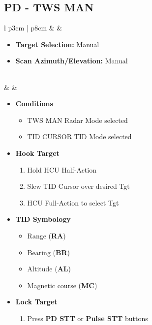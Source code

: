 \documentclass[10pt,usenames,dvipsnames,twoside]{report}
\begin{document}
	\subsection{PD - TWS MAN}
	\thumbnar
	\begin{center}
		\begin{longtable}{l p{3cm} | p{8cm}}
			\toprule
			\textbullet &  &
			\begin{minipage}[t]{\linewidth}
				\vspace{-7pt}
				\begin{itemize}
					\item \textbf{Target Selection:} Manual
					\item \textbf{Scan Azimuth/Elevation:} Manual
				\end{itemize}
			\end{minipage} \\
			\midrule
			\textbullet &  &
			\begin{minipage}[t]{\linewidth}
				\vspace{-7pt}
				\begin{itemize}
					\item \textbf{Conditions}
					\begin{itemize}
						\item TWS MAN Radar Mode selected
						\item TID CURSOR TID Mode selected
					\end{itemize}
					\item \textbf{Hook Target}
					\begin{enumerate}
						\item Hold HCU Half-Action
						\item Slew TID Cursor over desired Tgt
						\item HCU Full-Action to select Tgt
					\end{enumerate}
					\item \textbf{TID Symbology}
					\begin{itemize}
						\item Range (\textbf{RA})
						\item Bearing (\textbf{BR})
						\item Altitude (\textbf{AL})
						\item Magnetic course (\textbf{MC})
					\end{itemize}
					\item \textbf{Lock Target}
					\begin{enumerate}[label=(\alph*), resume]
						\item Press \textbf{PD STT} or \textbf{Pulse STT} buttons

\end{enumerate}
\end{itemize}
\end{minipage}
\end{longtable}
\end{center}
\end{document}
